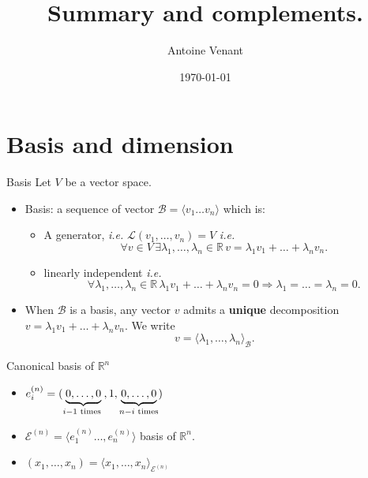 \documentclass{beamer}
\begin{document}
\title{Summary and complements.} 
\author{Antoine Venant}
\date{\today}

\maketitle


\section{Basis and dimension}

\begin{frame}{Basis}
  Let $V$ be a vector space.

  \begin{itemize}
  \item Basis: a sequence of vector $\mathcal{B} = \langle v_1 \dots v_n \rangle$ which is:
    \begin{itemize}
    \item A generator, \emph{i.e.} $\mathcal{L}(v_1, \dots, v_n ) = V$ \emph{i.e.} \[\forall v \in V\, \exists \lambda_1, \dots, \lambda_n \in \mathbb{R}\, v = \lambda_1 v_1 + \dots + \lambda_n v_n.\]
    \item linearly independent \emph{i.e.} \[\forall \lambda_1,\dots, \lambda_n \in \mathbb{R} \, \lambda_1 v_1 + \dots + \lambda_n v_n = 0 \Rightarrow \lambda_1 = \dots = \lambda_n = 0.\]
    \end{itemize}
  \item When $\mathcal{B}$ is a basis, any vector $v$ admits a {\bf unique} decomposition $v = \lambda_1 v_1 + \dots + \lambda_n v_n$. We write \[v = \langle \lambda_1, \dots, \lambda_n \rangle_{\mathcal{B}}.\]
  \end{itemize}
\end{frame}

\begin{frame}{Canonical basis of $\mathbb{R}^n$}
  \begin{itemize}
  \item $e^{(n)}_i = ( \underbrace{0,\dots, 0}_{i-1 \textnormal{ times }},1,\underbrace{0, \dots, 0}_{n-i \textnormal{ times}} )$
  \item $\mathcal{E}^{(n)} = \langle e^{(n)}_1 \dots, e^{(n)}_n \rangle$ basis of $\mathbb{R}^n$.
  \item $(x_1, \dots, x_n) = \langle x_1, \dots, x_n \rangle_{\mathcal{E}^{(n)}}$

  \end{itemize}
\end{frame}
\end{document}
